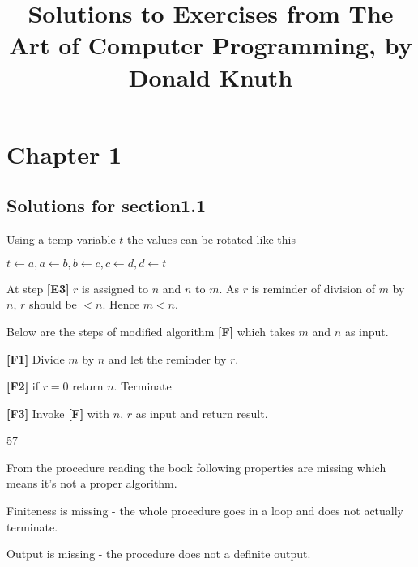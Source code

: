\documentclass[12pt]{article}
\title{Solutions to Exercises from The Art of Computer Programming, by Donald Knuth}
\begin{document}
\maketitle
\section{Chapter 1}
\subsection{Solutions for section1.1} 
\begin{enumerate}
\begin{item}
Using a temp variable $t$ the values can be rotated like this -

$ t \leftarrow a, a \leftarrow b, b \leftarrow c, c \leftarrow d, d \leftarrow t $ 
\end{item}


\begin{item}
  At step {\bf[E3]} $r$ is assigned to $n$ and $n$ to $m$. As $r$ is reminder of division of $m$ by $n$, $r$ should be $< n$. Hence $m < n$. 
\end{item}

\begin{item}

  Below are the steps of modified algorithm {\bf[F]} which takes $m$ and $n$ as input.
  
  {\bf[F1]} Divide $m$ by $n$ and let the reminder by $r$.

  {\bf[F2]} if $r = 0$ return $n$. Terminate

  {\bf[F3]} Invoke {\bf[F]} with $n$, $r$ as input and return result.
\end{item}


\begin{item}

  57
  
\end{item}


\begin{item}

  From the procedure reading the book following properties are missing which means it's not a proper algorithm.
  \begin{itemize}
    \begin{item}
      Finiteness is missing - the whole procedure goes in a loop and does not actually terminate.
    \end{item}

    \begin{item}
      Output is missing - the procedure does not a definite output.
    \end{item}


\end{itemize}
\end{item}
\end{enumerate}
\end{document}
